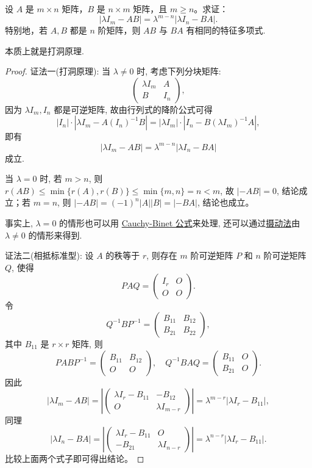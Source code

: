 \documentclass[../../main.tex]{subfiles}%
\begin{document}
\begin{theorem}[特征值的降价公式]\label{theorem:特征值的降价公式}
设 \( A \) 是 \( m \times n \) 矩阵，\( B \) 是 \( n \times m \) 矩阵，且 \( m \geqslant  n \)。求证：
\[
|\lambda I_m - AB| = \lambda^{m-n} |\lambda I_n - BA|.
\]
特别地，若 \( A, B \) 都是 \( n \) 阶矩阵，则 \( AB \) 与 \( BA \) 有相同的特征多项式.
\end{theorem}
\begin{note}
本质上就是打洞原理.
\end{note}
\begin{proof}

{\color{blue}证法一(打洞原理):} 当 \(\lambda \neq 0\) 时, 考虑下列分块矩阵:
\[
\begin{pmatrix}
\lambda I_m & A \\
B & I_n
\end{pmatrix},
\]
因为 \(\lambda I_m, I_n\) 都是可逆矩阵, 故由行列式的降阶公式可得
\[
|I_n| \cdot |\lambda I_m - A(I_n)^{-1}B| = |\lambda I_m| \cdot |I_n - B(\lambda I_m)^{-1}A|,
\]
即有
\[
|\lambda I_m - AB| = \lambda^{m-n} |\lambda I_n - BA|
\]
成立.

当 \(\lambda = 0\) 时, 若 \(m > n\), 则 \(r(AB) \leqslant  \min\{r(A), r(B)\} \leqslant  \min\{m, n\} = n < m\), 故 \(|-AB| = 0\), 结论成立；若 \(m = n\), 则 \(|-AB| = (-1)^n |A||B| = |-BA|\), 结论也成立。

事实上, \(\lambda = 0\) 的情形也可以用 \hyperref[theorem:Cauchy-Binet公式]{Cauchy-Binet 公式}来处理, 还可以通过\hyperref[proposition:摄动法基本命题]{摄动法}由 \(\lambda \neq 0\) 的情形来得到.

{\color{blue}证法二(相抵标准型):} 设 \(A\) 的秩等于 \(r\), 则存在 \(m\) 阶可逆矩阵 \(P\) 和 \(n\) 阶可逆矩阵 \(Q\), 使得
\[
PAQ = \begin{pmatrix}
I_r & O \\
O & O
\end{pmatrix}.
\]
令
\[
Q^{-1}BP ^{-1}= \begin{pmatrix}
B_{11} & B_{12} \\
B_{21} & B_{22}
\end{pmatrix},
\]
其中 \(B_{11}\) 是 \(r \times r\) 矩阵, 则
\[
PABP^{-1} = \begin{pmatrix}
B_{11} & B_{12} \\
O & O
\end{pmatrix}, \quad Q^{-1}BAQ = \begin{pmatrix}
B_{11} & O \\
B_{21} & O
\end{pmatrix}.
\]
因此
\[
|\lambda I_m - AB| = \left| \begin{pmatrix}
\lambda I_r - B_{11} & -B_{12} \\
O & \lambda I_{m-r}
\end{pmatrix} \right| = \lambda^{m-r} |\lambda I_r - B_{11}|,
\]
同理
\[
|\lambda I_n - BA| = \left| \begin{pmatrix}
\lambda I_r - B_{11} & O \\
-B_{21} & \lambda I_{n-r}
\end{pmatrix} \right| = \lambda^{n-r} |\lambda I_r - B_{11}|.
\]
比较上面两个式子即可得出结论。


\end{proof}
\end{document}
